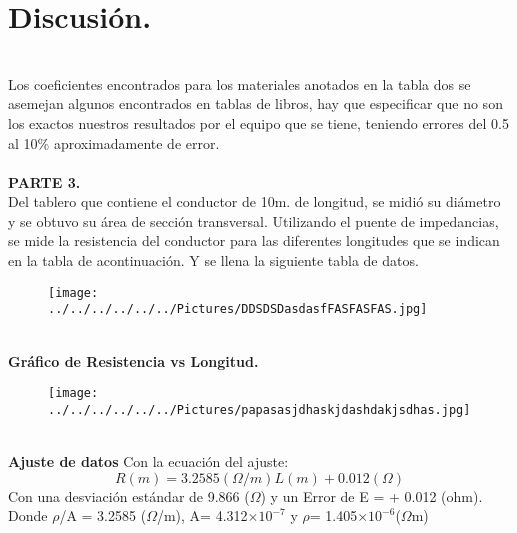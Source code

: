 \documentclass[11pt,a4paper]{article}
\begin{document}
\section*{Discusi\'{o}n.}\\
Los coeficientes encontrados para los materiales anotados en la tabla dos se asemejan  algunos encontrados en tablas de libros, hay que especificar que no son los exactos nuestros resultados por el equipo que se tiene, teniendo errores del 0.5 al 10$\%$ aproximadamente de error.
\\
\pagebreak
\\
\textbf{PARTE 3.}
\\
Del tablero que contiene el conductor de 10m. de longitud, se midi\'{o} su di\'{a}metro y se obtuvo su \'{a}rea de secci\'{o}n transversal. Utilizando el puente de impedancias, se mide la resistencia del conductor para las diferentes longitudes que se indican en la tabla de acontinuaci\'{o}n. Y se llena la siguiente tabla de datos.
\\
\begin{figure}[hbtp]
 \centering
 \texttt{[image: ../../../../../../Pictures/DDSDSDasdasfFASFASFAS.jpg]}
 \end{figure}
\\
\textbf{Gr\'{a}fico de Resistencia vs Longitud.}
\begin{figure}[hbtp]
\centering
\texttt{[image: ../../../../../../Pictures/papasasjdhaskjdashdakjsdhas.jpg]}
\end{figure}
\\
\textbf{Ajuste de datos} Con la ecuación del ajuste:  
\[R (m) = 3.2585 (\Omega/m)L(m) + 0.012 (\Omega)\]
Con una desviaci\'{o}n estándar de 9.866 ($\Omega$) y un Error de E = +  0.012 (ohm). Donde $\rho$/A = 3.2585 ($\Omega$/m), A= 4.312$\times {10}^{-7}$ y $\rho$=  1.405$\times{10}^{-6}$($\Omega$m)
\end{document}
